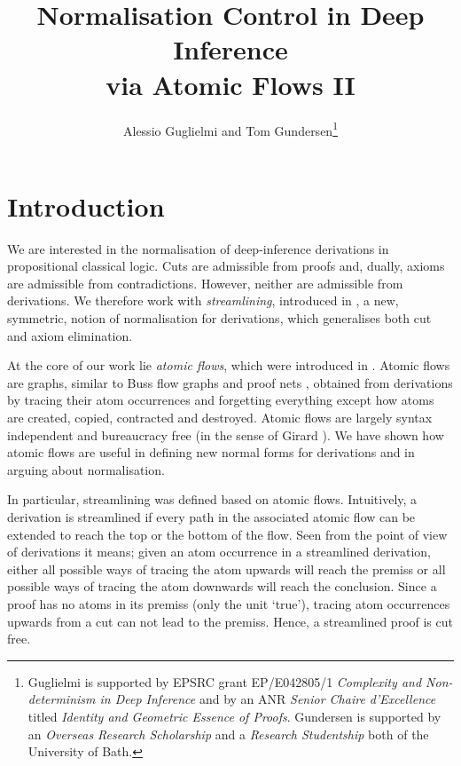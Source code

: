 \documentclass[a4paper]{llncs}
\begin{document}
\title{Normalisation Control in Deep Inference\\ via Atomic Flows II}

\author{Alessio Guglielmi and Tom Gundersen\thanks{Guglielmi is supported by EPSRC grant EP/E042805/1 \emph{Complexity and Non-determinism in Deep Inference} and by an ANR \emph{Senior Chaire d'Excellence} titled \emph{Identity and Geometric Essence of Proofs}. Gundersen is supported by an \emph{Overseas Research Scholarship} and a \emph{Research Studentship} both of the University of Bath.}}



\maketitle

\section{Introduction}


We are interested in the normalisation of deep-inference derivations in propositional classical logic. Cuts are admissible from proofs and, dually, axioms are admissible from contradictions. However, neither are admissible from derivations. We therefore work with \emph{streamlining}, introduced in \cite{GuglGund:07:Normalis:lr}, a new, symmetric, notion of normalisation for derivations, which generalises both cut and axiom elimination.

At the core of our work lie \emph{atomic flows}, which were introduced in \cite{GuglGund:07:Normalis:lr}. Atomic flows are graphs, similar to Buss flow graphs \cite{Buss:91:The-Unde:uq} and proof nets \cite{Gira:87:Linear-L:wm}, obtained from derivations by tracing their atom occurrences and forgetting everything except how atoms are created, copied, contracted and destroyed. Atomic flows are largely syntax independent and bureaucracy free (in the sense of Girard \cite{Gira:89:Geometry:sh}). We have shown how atomic flows are useful in defining new normal forms for derivations and in arguing about normalisation.

In particular, streamlining was defined based on atomic flows. Intuitively, a derivation is streamlined if every path in the associated atomic flow can be extended to reach the top or the bottom of the flow. Seen from the point of view of derivations it means; given an atom occurrence in a streamlined derivation, either all possible ways of tracing the atom upwards will reach the premiss or all possible ways of tracing the atom downwards will reach the conclusion. Since a proof has no atoms in its premiss (only the unit `true'), tracing atom occurrences upwards from a cut can not lead to the premiss. Hence, a streamlined proof is cut free.
\end{document}
